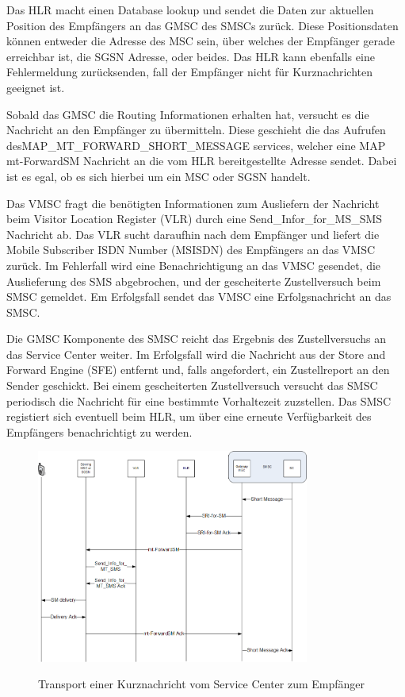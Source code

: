 \documentclass[german,12pt,a4paper]{article}
\begin{document}
Das HLR macht einen Database lookup und sendet die Daten zur aktuellen Position des Empfängers an das 
GMSC des SMSCs zurück. Diese Positionsdaten können entweder die Adresse des MSC sein, über welches der 
Empfänger gerade erreichbar ist, die SGSN Adresse, oder beides. Das HLR kann ebenfalls eine Fehlermeldung 
zurücksenden, fall der Empfänger nicht für Kurznachrichten geeignet ist.

Sobald das GMSC die Routing Informationen erhalten hat, versucht es die Nachricht an den Empfänger zu 
übermitteln. Diese geschieht die das Aufrufen desMAP\_MT\_FORWARD\_SHORT\_MESSAGE services, welcher eine
MAP mt-ForwardSM Nachricht an die vom HLR bereitgestellte Adresse sendet. Dabei ist es egal, ob es sich 
hierbei um ein MSC oder SGSN handelt.

Das VMSC fragt die benötigten Informationen zum Ausliefern der Nachricht beim Visitor Location Register
(VLR) durch eine Send\_Infor\_for\_MS\_SMS Nachricht ab. Das VLR sucht daraufhin nach dem Empfänger und
liefert die Mobile Subscriber ISDN Number (MSISDN) des Empfängers an das VMSC zurück. Im Fehlerfall wird 
eine Benachrichtigung an das VMSC gesendet, die Auslieferung des SMS abgebrochen, und der gescheiterte 
Zustellversuch beim SMSC gemeldet. Em Erfolgsfall sendet das VMSC eine Erfolgsnachricht an das SMSC.

Die GMSC Komponente des SMSC reicht das Ergebnis des Zustellversuchs an das Service Center weiter. Im
Erfolgsfall wird die Nachricht aus der Store and Forward Engine (SFE) entfernt und, falls angefordert,
ein Zustellreport an den Sender geschickt. Bei einem gescheiterten Zustellversuch versucht das SMSC
periodisch die Nachricht für eine bestimmte Vorhaltezeit zuzstellen. Das SMSC registiert sich eventuell 
beim HLR, um über eine erneute Verfügbarkeit des Empfängers benachrichtigt zu werden.

\begin{figure}[htm]
    \centering
	\includegraphics[width=0.8\textwidth]{img/mt-forward-sm.png}
    \label{fig:mt-forward-sm}
    \caption{Transport einer Kurznachricht vom Service Center zum Empfänger}
\end{figure}	
\end{document}
